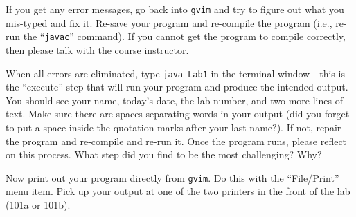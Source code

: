 
If you get any error messages, go back into {\tt gvim} and try to figure out what you mis-typed and fix it. Re-save your
program  and re-compile the program (i.e., re-run the ``{\tt javac}'' command). If you cannot get the program to compile
correctly, then please talk with the course instructor.

When all errors are eliminated, type {\tt java Lab1} in the terminal window---this is the ``execute'' step that will run
your program and produce the intended output.  You should see your name, today's date, the lab number, and two more
lines of text. Make sure there are spaces separating words in your output (did you forget to put a space inside the
  quotation marks after your last name?). If not, repair the program and re-compile and re-run it.  Once the program
runs, please reflect on this process.  What step did you find to be the most challenging? Why?




Now print out your program directly from {\tt gvim}. Do this with the ``File/Print'' menu item. Pick up your output at
one of the two printers in the front of the lab (101a or 101b).


